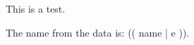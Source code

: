 \documentclass{article}
\begin{document}
This is a test.

The name from the data is: (( name | e )).
\end{document}
